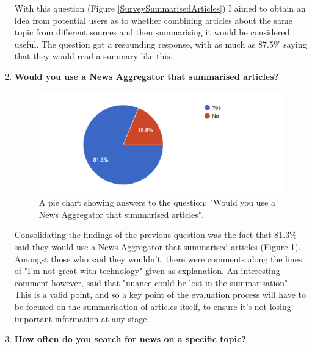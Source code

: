 \documentclass[12pt]{article}
\begin{document}
\begin{enumerate}
With this question (Figure \ref{SurveySummarisedArticles}) I aimed to obtain an idea from potential users as to whether combining articles about the same topic from different sources and then summarising it would be considered useful. The question got a resounding response, with as much as 87.5\% saying that they would read a summary like this.  \\

\item \textbf{Would you use a News Aggregator that summarised articles?}

\begin{figure}[ht!]
  \centering
    \includegraphics[scale=0.7]{08WouldYouUseANewsAggregatorThatSummarised}
   \caption[Survey Graph concerning News Aggregators and summarisation]{A pie chart showing answers to the question: "Would you use a News Aggregator that summarised articles".}
  \label{NewsAggregatorThatSummarised}
\end{figure}

Consolidating the findings of the previous question was the fact that 81.3\% said they would use a News Aggregator that summarised articles (Figure \ref{NewsAggregatorThatSummarised}). Amongst those who said they wouldn't, there were comments along the lines of "I'm not great with technology" given as explanation. An interesting comment however, said that "nuance could be lost in the summarisation". This is a valid point, and so a key point of the evaluation process will have to be focused on the summarisation of articles itself, to ensure it's not losing important information at any stage.\\

\item \textbf{How often do you search for news on a specific topic?}


\end{enumerate}
\end{document}
